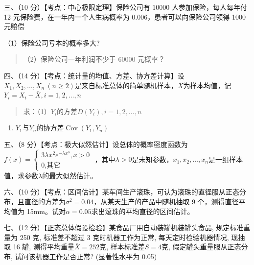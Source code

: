 \documentclass[fontset=exam]{exam-zh}
\begin{document}
三、（10 分）【考点：中心极限定理】保险公司有 10000 人参加保险，每人每年付 12 元保险费，在一年内一个人生病概率为 0.006，患者可以向保险公司领得 1000 元赔偿

（1）保险公司亏本的概率多大?

\begin{quote}
（2）保险公司一年利润不少于 60000 元概率？
\end{quote}


四、（14 分）【考点：统计量的均值、方差、协方差计算】设\(X_1,X_2,\ldots,X_n\ (n\geq2)\)是来自标准总体的简单随机样本，\(\overline X\)为样本均值，记\(Y_i=X_i-\overline X,i=1,2,\ldots,n\)

\begin{quote}
求：（1）\(Y_i\)的方差\(D(Y_i),i=1,2,\ldots,n\)
\end{quote}

\begin{enumerate}
\def\labelenumi{\arabic{enumi}.}
\setcounter{enumi}{1}
\item
  \(Y_1\)与\(Y_n\)的协方差\(\operatorname{Cov}(Y_1,Y_n)\)
\end{enumerate}


五、（8 分）【考点：极大似然估计】设总体的概率密度函数为 \(f(x) = \left\{ \begin{array}{l}
{\text{3}\lambda x^{2}e^{- \lambda x^{3}},x > 0} \\
{0\text{,}\text{其它}}
\end{array} \right.\) ，其中\(\lambda>0\)是未知参数，\(x_1,x_2,\ldots,x_n\)是一组样本值，求参数\(\lambda\)的最大似然估计。


六、（10 分）【考点：区间估计】某车间生产滚珠，可认为滚珠的直径服从正态分布，且直径的方差为\(\sigma^2=0.04\)，从某天生产的产品中随机抽取 9 个，测得直径平均值为 15mm。试对\(\alpha=0.05\)求出滚珠的平均直径的区间估计。


七、（12 分）【正态总体假设检验】某食品厂用自动装罐机装罐头食品, 规定标准重量为 250 克, 标准差不超过 3 克时机器工作为正常, 每天定时检验机器情况, 现抽取 16 罐, 测得平均重量\(\overline X=252\)克, 样本标准差\(S=4\)克, 假定罐头重量服从正态分布, 试问该机器工作是否正常? (显著性水平为 0.05)
\end{document}
